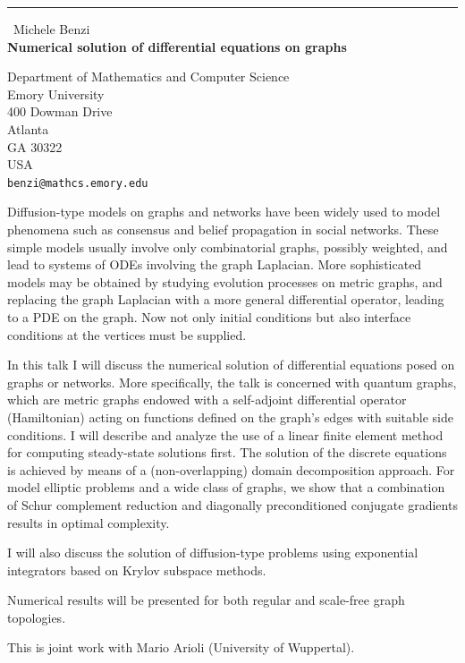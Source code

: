 \documentclass{report}
\begin{document}
\begin{center}
\rule{6in}{1pt} \
{\large Michele Benzi \\
{\bf Numerical solution of differential equations on graphs}}

Department of Mathematics and Computer Science \\ Emory University \\ 400 Dowman Drive \\ Atlanta \\ GA 30322 \\ USA
\\
{\tt benzi@mathcs.emory.edu}\end{center}

Diffusion-type models on graphs and networks have been widely used to
model phenomena such as consensus and belief propagation in social
networks. These simple models usually involve only combinatorial graphs,
possibly weighted, and lead to systems of ODEs involving the graph
Laplacian. More sophisticated models may be obtained by studying
evolution processes on metric graphs, and
replacing the graph Laplacian with a more general differential operator,
leading to a PDE on the graph. Now not only initial conditions but also
interface conditions at the vertices must be supplied.

In this talk I will discuss
the numerical solution of differential equations posed on graphs or networks.
More specifically, the talk is concerned with
quantum graphs, which are metric graphs endowed with a self-adjoint
differential operator (Hamiltonian)
acting on functions defined on the graph's edges with
suitable side conditions. I will describe and analyze the use of
a linear finite element method for computing steady-state
solutions first.
The solution of the discrete equations is achieved by means of a
(non-overlapping) domain decomposition approach.
For model elliptic problems and a wide class of graphs, we show that
a combination of Schur complement reduction and diagonally preconditioned
conjugate gradients results in optimal complexity.

I will also discuss the solution of diffusion-type problems
using exponential integrators based on Krylov subspace methods.

Numerical results will be presented for both regular and
scale-free graph topologies.

This is joint work with Mario Arioli (University of Wuppertal).
\end{document}

